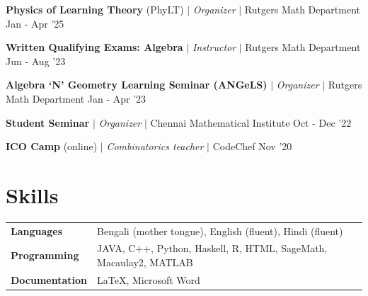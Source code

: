 \resumeProjectHeading
{\textbf{Physics of Learning Theory} (PhyLT) $|$ \textit{Organizer} $|$ Rutgers Math Department}
{Jan - Apr '25}
{}
\vspace{\mygap}

\resumeProjectHeading
{\textbf{Written Qualifying Exams: Algebra} $|$ \textit{Instructor} $|$ Rutgers Math Department}
{Jun - Aug '23}
{}
\vspace{\mygap}


\resumeProjectHeading
{\textbf{Algebra `N' Geometry Learning Seminar (ANGeLS)} $|$ \textit{Organizer} $|$ Rutgers Math Department}
{Jan - Apr '23}
{}
\vspace{\mygap}

\resumeProjectHeading
{\textbf{Student Seminar} $|$ \textit{Organizer} $|$ Chennai Mathematical Institute}
{Oct - Dec '22}
{}
\vspace{\mygap}

\resumeProjectHeading
{\textbf{ICO Camp}  (online) $|$ \textit{Combinatorics teacher} $|$ CodeChef}
{Nov '20}
{}


\resumeSubHeadingListEnd




\section{Skills}

\begin{tabular*}{\textwidth}{l @{\hskip 0.5in} l}
\textbf{Languages} & Bengali (mother tongue), English (fluent), Hindi (fluent)\\
\textbf{Programming}  & {JAVA, C++, Python, Haskell, R, HTML, SageMath, Macaulay2,  MATLAB} \\
\textbf {Documentation} & {\LaTeX, Microsoft Word} \\
\end{tabular*}









